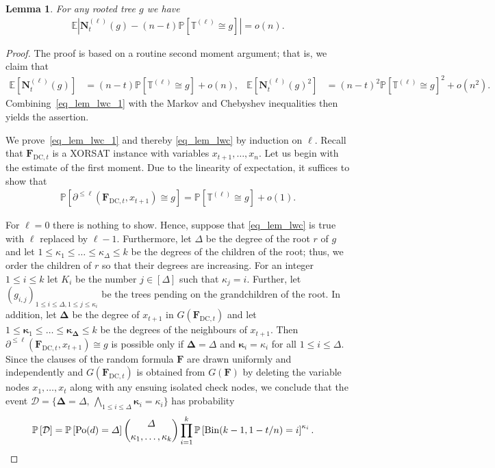\documentclass[10pt,reqno]{amsart}
\numberwithin{equation}{section}
\newcommand{\ism}{\cong}
\renewcommand{\vec}[1]{\boldsymbol{#1}}
\newcommand{\FDC}[1]{\PHI_{\mathrm{DC},{#1}}}
\newcommand{\TT}{\mathbb T}
\newcommand\PHI{\vec F}
\newcommand\cD{\mathcal D}
\newcommand\vN{\vec N}
\newcommand\Erw{\mathbb{E}}
\newcommand\ex{\Erw}
\newcommand{\Po}{{\rm Po}}
\newcommand{\Bin}{{\rm Bin}}
\newcommand\brk[1]{\left\lbrack{#1}\right\rbrack}
\newcommand\abs[1]{\left|{#1}\right|}
\newcommand\pr{\mathbb{P}}
\newtheorem{lemma}[definition]{Lemma}
\def\pr{{\mathbb P}}
\begin{document}
\begin{lemma}\label{lem_lwc}
	For any rooted tree $g$ we have
	\begin{align}\label{eq_lem_lwc}
		\ex\abs{\vN_t^{(\ell)}(g)-(n-t)\pr\brk{\TT^{(\ell)}\ism g}}=o(n).
	\end{align}
\end{lemma}
\begin{proof}
	The proof is based on a routine second moment argument; that is, we claim that
	\begin{align}\label{eq_lem_lwc_1}
		\ex\brk{\vN_t^{(\ell)}(g)}&=(n-t)\pr\brk{\TT^{(\ell)}\ism g}+o(n),&
		\ex\brk{\vN_t^{(\ell)}(g)^2}&=(n-t)^2\pr\brk{\TT^{(\ell)}\ism g}^2+o(n^2).
	\end{align}
	Combining~\eqref{eq_lem_lwc_1} with the Markov and Chebyshev inequalities then yields the assertion.

	We prove~\eqref{eq_lem_lwc_1} and thereby \eqref{eq_lem_lwc} by induction on $\ell$.
	Recall that $\FDC t$ is a XORSAT instance with variables $x_{t+1},\ldots,x_n$.
	Let us begin with the estimate of the first moment. 
	Due to the linearity of expectation, it suffices to show that
	\begin{align}\label{eq_lem_lwc_2}
		\pr\brk{\partial^{\leq\ell}(\FDC t,x_{t+1})\ism g}=\pr\brk{\TT^{(\ell)}\ism g}+o(1).
	\end{align}

	For $\ell=0$ there is nothing to show.
	Hence, suppose that \eqref{eq_lem_lwc} is true with $\ell$ replaced by $\ell-1$.
	Furthermore, let $\Delta$ be the degree of the root $r$ of $g$ and let $1\leq\kappa_1\leq\ldots\leq\kappa_\Delta\leq k$ be the degrees of the children of the root; thus, we order the children of $r$ so that their degrees are increasing.
	For an integer $1\leq i\leq k$ let $K_i$ be the number $j\in[\Delta]$ such that $\kappa_j=i$.
	Further, let $(g_{i,j})_{1\leq i\leq \Delta,1\leq j\leq\kappa_i}$ be the trees pending on the grandchildren of the root.
	In addition, let $\vec\Delta$ be the degree of $x_{t+1}$ in $G(\FDC t)$ and let $1\leq\vec\kappa_1\leq\ldots\leq\vec\kappa_{\vec\Delta}\leq k$ be the degrees of the neighbours of $x_{t+1}$.
	Then $\partial^{\leq\ell}(\FDC t,x_{t+1})\ism g$ is possible only if $\vec\Delta = \Delta$ and $\vec\kappa_i=\kappa_i$ for all $1\leq i\leq\Delta$.
	Since the clauses of the random formula $\PHI$ are drawn uniformly and independently and $G(\FDC{t})$ is obtained from $G(\PHI)$ by deleting the variable nodes $x_1,\ldots,x_t$ along with any ensuing isolated check nodes, we conclude that the event $\cD=\{\vec\Delta=\Delta,\,\bigwedge_{1\leq i\leq\Delta}\vec\kappa_i=\kappa_i\}$ has probability
	\begin{align}\label{eq_lem_lwc_3}
		\pr\brk{\cD}&=\pr\brk{\Po(d)=\Delta} \binom{\Delta}{\kappa_1,\ldots,\kappa_k} \prod_{i=1}^k\pr\brk{\Bin(k-1,1-t/n)=i}^{\kappa_i}.
	\end{align}


\end{proof}
\end{document}
